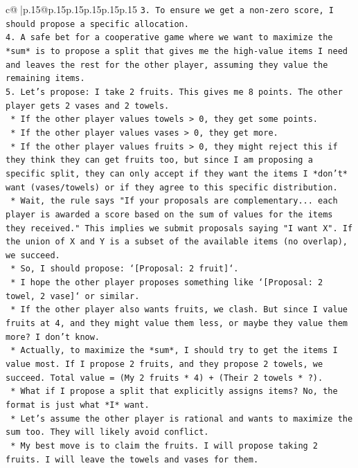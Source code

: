 \documentclass{article}
\begin{document}
{\begin{supertabular}{c@{$\;$}|p{.15\linewidth}@{}p{.15\linewidth}p{.15\linewidth}p{.15\linewidth}p{.15\linewidth}p{.15\linewidth}}
{{{\texttt{3.  To ensure we get a non{-}zero score, I should propose a specific allocation.} \\
\texttt{4.  A safe bet for a cooperative game where we want to maximize the *sum* is to propose a split that gives me the high{-}value items I need and leaves the rest for the other player, assuming they value the remaining items.} \\
\texttt{5.  Let's propose: I take 2 fruits. This gives me 8 points. The other player gets 2 vases and 2 towels.} \\
\texttt{    *   If the other player values towels > 0, they get some points.} \\
\texttt{    *   If the other player values vases > 0, they get more.} \\
\texttt{    *   If the other player values fruits > 0, they might reject this if they think they can get fruits too, but since I am proposing a specific split, they can only accept if they want the items I *don't* want (vases/towels) or if they agree to this specific distribution.} \\
\texttt{    *   Wait, the rule says "If your proposals are complementary... each player is awarded a score based on the sum of values for the items they received." This implies we submit proposals saying "I want X". If the union of X and Y is a subset of the available items (no overlap), we succeed.} \\
\texttt{    *   So, I should propose: `{[}Proposal: 2 fruit{]}`.} \\
\texttt{    *   I hope the other player proposes something like `{[}Proposal: 2 towel, 2 vase{]}` or similar.} \\
\texttt{    *   If the other player also wants fruits, we clash. But since I value fruits at 4, and they might value them less, or maybe they value them more? I don't know.} \\
\texttt{    *   Actually, to maximize the *sum*, I should try to get the items I value most. If I propose 2 fruits, and they propose 2 towels, we succeed. Total value = (My 2 fruits * 4) + (Their 2 towels * ?).} \\
\texttt{    *   What if I propose a split that explicitly assigns items? No, the format is just what *I* want.} \\
\texttt{    *   Let's assume the other player is rational and wants to maximize the sum too. They will likely avoid conflict.} \\
\texttt{    *   My best move is to claim the fruits. I will propose taking 2 fruits. I will leave the towels and vases for them.} \\
}}}
\end{supertabular}}
\end{document}
